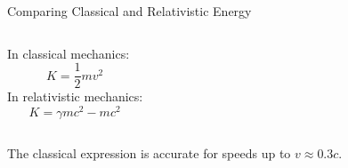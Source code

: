 \documentclass[12pt,compress,aspectratio=169]{beamer}
\begin{document}
\begin{frame}{Comparing Classical and Relativistic Energy}
  \begin{columns}
    In classical mechanics:
    {\Large
      \begin{displaymath}
        K=\frac12mv^2
      \end{displaymath}
    }
    In relativistic mechanics:
    {\Large
      \begin{displaymath}
        K=\gamma mc^2-mc^2
      \end{displaymath}
    }
    
  \end{columns}

  The classical expression is accurate for speeds up to $v\approx 0.3c$.
\end{frame}



\end{document}
